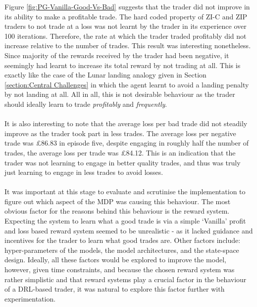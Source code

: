 \documentclass[ %
                    author={Ashwinder Khurana},
                supervisor={Prof Dave Cliff},
                    degree={MEng},
                     title={The Deeply Reinforced Trader},
                  subtitle={},
                      type={enterprise},
                      year={2020} ]{dissertation}
\begin{document}
{\noindent
Figure \ref{fig:PG-Vanilla-Good-Vs-Bad} suggests that the trader did not improve in its ability to make a profitable trade. The hard coded property of ZI-C and ZIP traders to not trade at a loss was not learnt by the trader in its experience over 100 iterations. Therefore, the rate at which the trader traded profitably did not increase relative to the number of trades. This result was interesting nonetheless. Since majority of the rewards received by the trader had been negative, it seemingly had learnt to increase its total reward by not trading at all. This is exactly like the case of the Lunar landing analogy given in Section \ref{section:Central Challenges} in which the agent learnt to avoid a landing penalty by not landing at all. All in all, this is not desirable behaviour as the trader should ideally learn to trade \textit{profitably} and \textit{frequently}.
\\
\\
\noindent
It is also interesting to note that the average loss per bad trade did not steadily improve as the trader took part in less trades. The average loss per negative trade was £86.83 in episode five, despite engaging in roughly half the number of trades, the average loss per trade was £84.12. This is an indication that the trader was not learning to engage in better quality trades, and thus was truly just learning to engage in less trades to avoid losses.
\\
\\
\noindent 
It was important at this stage to evaluate and scrutinise the implementation to figure out which aspect of the MDP was causing this behaviour. The most obvious factor for the reasons behind this behaviour is the reward system. Expecting the system to learn what a good trade is via a simple \enquote*{Vanilla} profit and loss based reward system seemed to be unrealistic - as it lacked guidance and incentives for the trader to learn what good trades are. Other factors include: hyper-parameters of the models, the model architectures, and the state-space design. Ideally, all these factors would be explored to improve the model, however, given time constraints, and because the chosen reward system was rather simplistic and that reward systems play a crucial factor in the behaviour of a DRL-based trader, it was natural to explore this factor further with experimentation.



}
\end{document}
